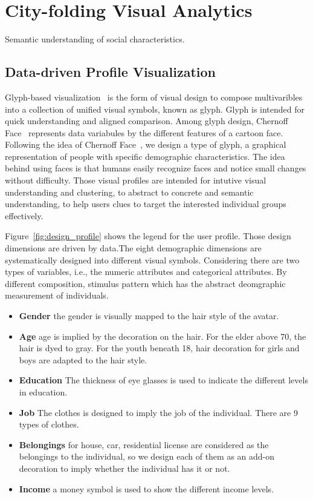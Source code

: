 \section{City-folding Visual Analytics}

Semantic understanding of social characteristics.

\subsection{Data-driven Profile Visualization}

Glyph-based visualization~\cite{borgo2013glyph} is the form of visual design to compose multivaribles into a collection of unified visual symbols, known as glyph. Glyph is intended for quick understanding and aligned comparison. Among glyph design, Chernoff Face~\cite{chernoff1973use} represents data variabules by the different features of a cartoon face. Following the idea of Chernoff Face~\cite{chernoff1973use}, we design a type of glyph, a graphical representation of people with specific demographic characteristics. The idea behind using faces is that humans easily recognize faces and notice small changes without difficulty. Those visual profiles are intended for intutive visual understanding and clustering, to abstract to concrete and semantic understanding, to help users clues to target the interested individual groups effectively.

Figure~\ref{fig:design_profile} shows the legend for the user profile. Those design dimensions are driven by data.The eight demographic dimensions are systematically designed into different visual symbols. Considering there are two types of variables, i.e., the numeric attributes and categorical attributes. By different composition, stimulus pattern which has the abstract deomgraphic measurement of individuals.

\begin{itemize}
\item \textbf{Gender} the gender is visually mapped to the hair style of the avatar. 
\item \textbf{Age} age is implied by the decoration on the hair. For the elder above 70, the hair is dyed to gray. For the youth beneath 18, hair decoration for girls and boys are adapted to the hair style.
\item \textbf{Education} The thickness of eye glasses is used to indicate the different levels in education.
\item \textbf{Job} The clothes is designed to imply the job of the individual. There are 9 types of clothes.
\item \textbf{Belongings} for house, car, residential license are considered as the belongings to the individual, so we design each of them as an add-on decoration to imply whether the individual has it or not.
\item \textbf{Income} a money symbol is used to show the different income levels.
\end{itemize} 

